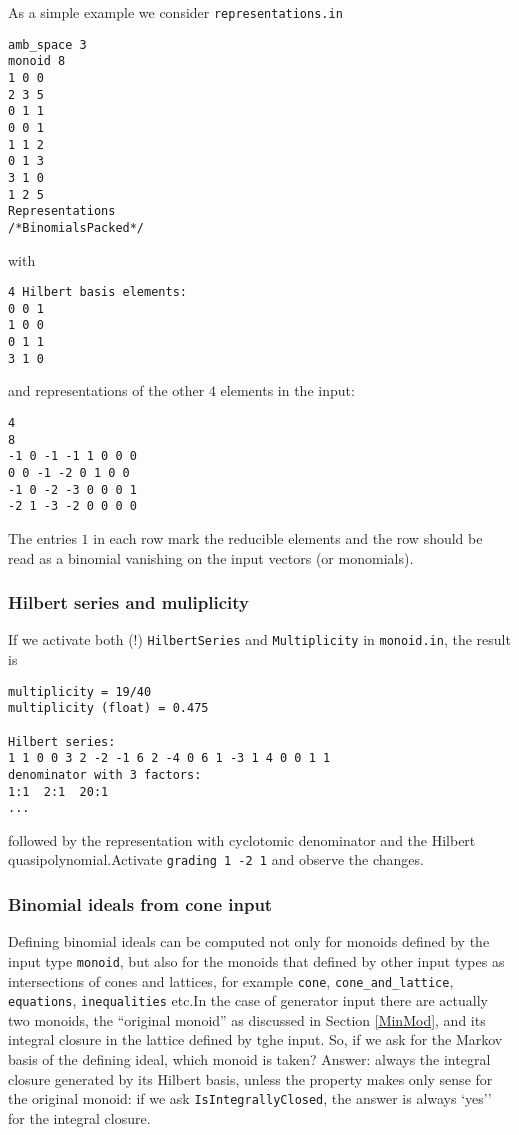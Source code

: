 As a simple example we consider \verb|representations.in|
\begin{Verbatim}
amb_space 3
monoid 8
1 0 0
2 3 5
0 1 1
0 0 1
1 1 2
0 1 3
3 1 0
1 2 5
Representations
/*BinomialsPacked*/
\end{Verbatim}
with
\begin{Verbatim}
4 Hilbert basis elements:
0 0 1
1 0 0
0 1 1
3 1 0
\end{Verbatim}
and representations of the other $4$ elements in the input:
\begin{Verbatim}
4
8
-1 0 -1 -1 1 0 0 0 
0 0 -1 -2 0 1 0 0 
-1 0 -2 -3 0 0 0 1 
-2 1 -3 -2 0 0 0 0
\end{Verbatim}
The entries $1$ in each row mark the reducible elements and the row should be read as a binomial vanishing on the input vectors (or monomials).


\subsubsection{Hilbert series and muliplicity}

If we activate both (!) \verb|HilbertSeries| and \verb|Multiplicity| in \verb|monoid.in|, the result is
\begin{Verbatim}
multiplicity = 19/40
multiplicity (float) = 0.475

Hilbert series:
1 1 0 0 3 2 -2 -1 6 2 -4 0 6 1 -3 1 4 0 0 1 1 
denominator with 3 factors:
1:1  2:1  20:1 
... 
\end{Verbatim}
followed by the representation with cyclotomic denominator and the Hilbert quasipolynomial.Activate \verb|grading 1 -2 1| and observe the changes.



\subsubsection{Binomial ideals from cone input}

Defining binomial ideals can be computed not only for monoids defined by the input type \verb|monoid|, but also for the monoids that defined by other input types as intersections of cones and lattices, for example \verb|cone|, \verb|cone_and_lattice|, \verb|equations|, \verb|inequalities| etc.In the case of generator input there are actually two monoids, the ``original monoid'' as discussed in Section \ref{MinMod}, and its integral closure in the lattice defined by tghe input. So, if we ask for the Markov basis of the defining ideal, which monoid is taken? Answer: always the integral closure generated by its Hilbert basis, unless the property makes only sense for the original monoid: if we ask \verb|IsIntegrallyClosed|, the answer is always `yes''  for the integral closure.

